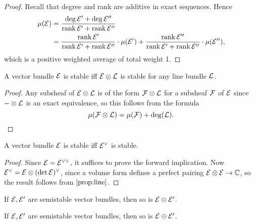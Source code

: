 \begin{proof}
    Recall that degree and rank are additive in exact sequences. Hence
    \begin{align*}
        \mu(\mathcal{E})
            &= \frac{\deg\mathcal{E}'+\deg\mathcal{E}''}{\operatorname{rank}\mathcal{E}'+\operatorname{rank}\mathcal{E}''} \\
            &= \frac{\operatorname{rank}\mathcal{E}'}{\operatorname{rank}\mathcal{E}'+\operatorname{rank}\mathcal{E}''}\cdot\mu(\mathcal{E}')
            + \frac{\operatorname{rank}\mathcal{E}''}{\operatorname{rank}\mathcal{E}'+\operatorname{rank}\mathcal{E}''}\cdot\mu(\mathcal{E}''),
    \end{align*}
    which is a positive weighted average of total weight 1.
\end{proof}

\begin{proposition}\label{prop:line}
    A vector bundle $\mathcal{E}$ is stable iff $\mathcal{E}\otimes\mathcal{L}$ is stable for any
    line bundle $\mathcal{L}$.
\end{proposition}

\begin{proof}
    Any subsheaf of $\mathcal{E}\otimes\mathcal{L}$ is of the form $\mathcal{F}\otimes\mathcal{L}$ for
    a subsheaf $\mathcal{F}$ of $\mathcal{E}$ since $-\otimes\mathcal{L}$ is an exact equivalence,
    so this follows from the formula
    \begin{equation*}
        \mu(\mathcal{F}\otimes\mathcal{L}) = \mu(\mathcal{F}) + \deg(\mathcal{L}).
    \end{equation*}
\end{proof}

\begin{proposition}\label{prop:stable dual}
    A vector bundle $\mathcal{E}$ is stable iff $\mathcal{E}^\vee$ is stable.
\end{proposition}

\begin{proof}
    Since $\mathcal{E}=\mathcal{E}^{\vee\vee}$, it suffices to prove the forward
    implication. Now $\mathcal{E}^\vee=\mathcal{E}\otimes(\det\mathcal{E})^\vee$, since a volume
    form defines a perfect pairing $\mathcal{E}\otimes\mathcal{E}\to\mathbb{C}$, so the result
    follows from $\cref{prop:line}$.
\end{proof}


\begin{proposition}
    If $\mathcal{E},\mathcal{E}'$ are semistable vector bundles, then so is
    $\mathcal{E}\otimes\mathcal{E}'$.
\end{proposition}

\begin{proposition}
    If $\mathcal{E},\mathcal{E}'$ are semistable vector bundles, then so is
    $\mathcal{E}\oplus\mathcal{E}'$.
\end{proposition}
